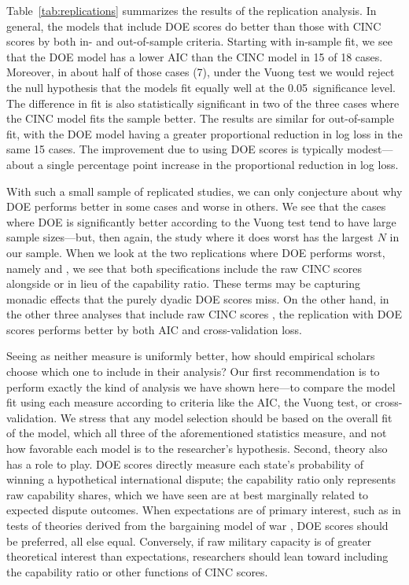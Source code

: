 Table~\ref{tab:replications} summarizes the results of the replication analysis.
In general, the models that include DOE scores do better than those with CINC scores by both in- and out-of-sample criteria.
Starting with in-sample fit, we see that the DOE model has a lower AIC than the CINC model in 15 of 18 cases.
Moreover, in about half of those cases (7), under the Vuong test we would reject the null hypothesis that the models fit equally well at the 0.05~significance level.
The difference in fit is also statistically significant in two of the three cases where the CINC model fits the sample better.
The results are similar for out-of-sample fit, with the DOE model having a greater proportional reduction in log loss in the same 15 cases.
The improvement due to using DOE scores is typically modest---about a single percentage point increase in the proportional reduction in log loss.

With such a small sample of replicated studies, we can only conjecture about why DOE performs better in some cases and worse in others.
We see that the cases where DOE is significantly better according to the Vuong test tend to have large sample sizes---but, then again, the study where it does worst has the largest $N$ in our sample.
When we look at the two replications where DOE performs worst, namely \citet{Bennett:2006gp} and \citet{Fordham:2008gs}, we see that both specifications include the raw CINC scores alongside or in lieu of the capability ratio.
These terms may be capturing monadic effects that the purely dyadic DOE scores miss.
On the other hand, in the other three analyses that include raw CINC scores \citep{Arena:2009gk,Zawahri:2011iy,Weeks:2012be}, the replication with DOE scores performs better by both AIC and cross-validation loss.

Seeing as neither measure is uniformly better, how should empirical scholars choose which one to include in their analysis?
Our first recommendation is to perform exactly the kind of analysis we have shown here---to compare the model fit using each measure according to criteria like the AIC, the Vuong test, or cross-validation.
We stress that any model selection should be based on the overall fit of the model, which all three of the aforementioned statistics measure, and not how favorable each model is to the researcher's hypothesis.
Second, theory also has a role to play.
DOE scores directly measure each state's probability of winning a hypothetical international dispute; the capability ratio only represents raw capability shares, which we have seen are at best marginally related to expected dispute outcomes.
When expectations are of primary interest, such as in tests of theories derived from the bargaining model of war \citep{fearon1995}, DOE scores should be preferred, all else equal.
Conversely, if raw military capacity is of greater theoretical interest than expectations, researchers should lean toward including the capability ratio or other functions of CINC scores.

